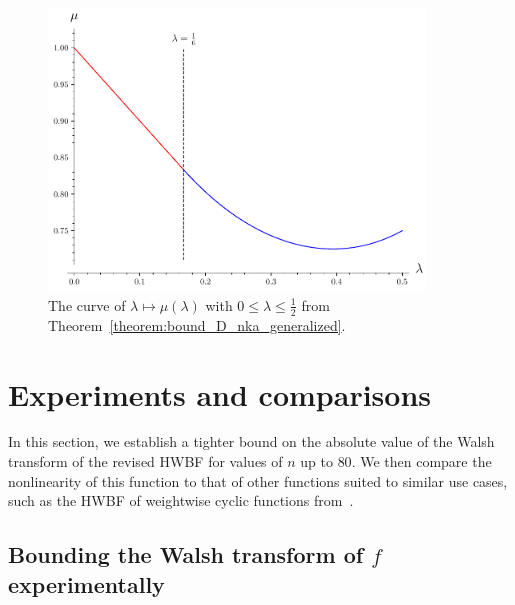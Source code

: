\documentclass[11pt]{llncs}
\begin{document}
\begin{figure}
	\centering
	\includegraphics[width=10cm]{curve_exponents_lambda_mu.pdf}
	\caption{The curve of $\lambda\mapsto\mu(\lambda)$ with $0\leq\lambda\leq\frac 12$ from Theorem~\ref{theorem:bound_D_nka_generalized}.}
	\label{fig:curve_exponents_lambda_mu}
\end{figure}



\section{Experiments and comparisons}\label{sec:expAndComp}

In this section, we establish a tighter bound on the absolute value of the Walsh transform of the revised HWBF for values of $n$ up to $80$. 
We then compare the nonlinearity of this function to that of other functions suited to similar use cases, such as the HWBF of weightwise cyclic functions from~\cite{DAM:MeaOza24}.

\subsection{Bounding the Walsh transform of $f$ experimentally}\label{sec:expwt}

\end{document}
